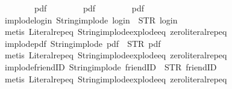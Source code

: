 \begin{isabellebody}
\ \ \ \ \ \ {\isacharparenleft}{\isacharparenleft}{}{\isacharcomma}\ {}{\isacharparenright}{\isacharcomma}\ pdf{\isacharparenright}{\isacharcomma}\isanewline
\ \ \ \ \ \ {\isacharparenleft}{\isacharparenleft}{}{\isacharcomma}\ {}{\isacharparenright}{\isacharcomma}\ pdf{}{\isacharparenright}{\isacharcomma}\isanewline
\ \ \ \ \ \ {\isacharparenleft}{\isacharparenleft}{}{\isacharcomma}\ {}{\isacharparenright}{\isacharcomma}\ pdf{}{\isacharparenright}\isanewline
{\isacharbar}{\isacharbraceright}{\isachardoublequoteclose}\isanewline
\isanewline
{}\isamarkupfalse%
\ implode{\isacharunderscore}login{\isacharcolon}\ {\isachardoublequoteopen}String{\isachardot}implode\ {\isacharprime}{\isacharprime}login{\isacharprime}{\isacharprime}\ {\isacharequal}\ STR\ {\isacharprime}{\isacharprime}login{\isacharprime}{\isacharprime}{\isachardoublequoteclose}\isanewline
%
\isadelimproof
\ \ %
\endisadelimproof
%
\isatagproof
{}\isamarkupfalse%
\ {\isacharparenleft}metis\ Literal{\isachardot}rep{\isacharunderscore}eq\ String{\isachardot}implode{\isacharunderscore}explode{\isacharunderscore}eq\ zero{\isacharunderscore}literal{\isachardot}rep{\isacharunderscore}eq{\isacharparenright}%
\endisatagproof
{\isafoldproof}%
%
\isadelimproof
\isanewline
%
\endisadelimproof
\isanewline
{}\isamarkupfalse%
\ implode{\isacharunderscore}pdf{\isacharcolon}\ {\isachardoublequoteopen}String{\isachardot}implode\ {\isacharprime}{\isacharprime}pdf{\isacharprime}{\isacharprime}\ {\isacharequal}\ STR\ {\isacharprime}{\isacharprime}pdf{\isacharprime}{\isacharprime}{\isachardoublequoteclose}\isanewline
%
\isadelimproof
\ \ %
\endisadelimproof
%
\isatagproof
{}\isamarkupfalse%
\ {\isacharparenleft}metis\ Literal{\isachardot}rep{\isacharunderscore}eq\ String{\isachardot}implode{\isacharunderscore}explode{\isacharunderscore}eq\ zero{\isacharunderscore}literal{\isachardot}rep{\isacharunderscore}eq{\isacharparenright}%
\endisatagproof
{\isafoldproof}%
%
\isadelimproof
\isanewline
%
\endisadelimproof
\isanewline
{}\isamarkupfalse%
\ implode{\isacharunderscore}friendID{\isacharcolon}\ {\isachardoublequoteopen}String{\isachardot}implode\ {\isacharprime}{\isacharprime}friendID{\isacharprime}{\isacharprime}\ {\isacharequal}\ STR\ {\isacharprime}{\isacharprime}friendID{\isacharprime}{\isacharprime}{\isachardoublequoteclose}\isanewline
%
\isadelimproof
\ \ %
\endisadelimproof
%
\isatagproof
{}\isamarkupfalse%
\ {\isacharparenleft}metis\ Literal{\isachardot}rep{\isacharunderscore}eq\ String{\isachardot}implode{\isacharunderscore}explode{\isacharunderscore}eq\ zero{\isacharunderscore}literal{\isachardot}rep{\isacharunderscore}eq{\isacharparenright}%

\end{isabellebody}
